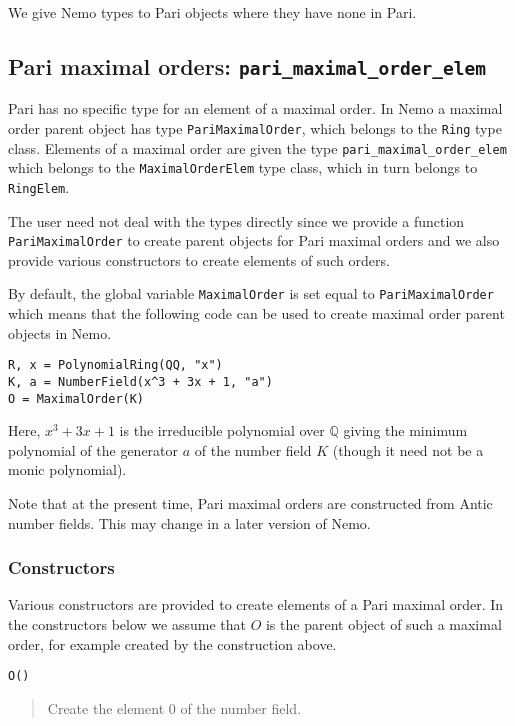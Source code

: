 \documentclass[a4paper,10pt]{article}
\newcommand{\Q}{\mathbb{Q}}
\newcommand{\code}{\lstinline}
\newcommand{\desc}[1]{\vspace{-3mm}\begin{quote}#1\end{quote}}
\begin{document}
{{We give Nemo types to Pari objects where they have none in Pari.

\subsection{Pari maximal orders: \code|pari_maximal_order_elem|}

Pari has no specific type for an element of a maximal order. In Nemo a maximal
order parent object has type \code{PariMaximalOrder}, which belongs to the
\code{Ring} type class. Elements of a maximal order are given the type
\code{pari_maximal_order_elem} which belongs to the \code{MaximalOrderElem}
type class, which in turn belongs to \code{RingElem}.

The user need not deal with the types directly since we provide a function
\code{PariMaximalOrder} to create parent objects for Pari maximal orders and we
also provide various constructors to create elements of such orders.

By default, the global variable \code{MaximalOrder} is set equal to
\code{PariMaximalOrder} which means that the following code can be used to
create maximal order parent objects in Nemo.

\begin{lstlisting}
R, x = PolynomialRing(QQ, "x")
K, a = NumberField(x^3 + 3x + 1, "a")
O = MaximalOrder(K)
\end{lstlisting}

Here, $x^3 + 3x + 1$ is the irreducible polynomial over $\Q$ giving the minimum
polynomial of the generator $a$ of the number field $K$ (though it need not be
a monic polynomial).

Note that at the present time, Pari maximal orders are constructed from Antic
number fields. This may change in a later version of Nemo.

\subsubsection{Constructors}

Various constructors are provided to create elements of a Pari maximal order.
In the constructors below we assume that $O$ is the parent object of such a maximal
order, for example created by the construction above.

\begin{lstlisting}
O()
\end{lstlisting}

\desc{Create the element $0$ of the number field.}

}}
\end{document}
